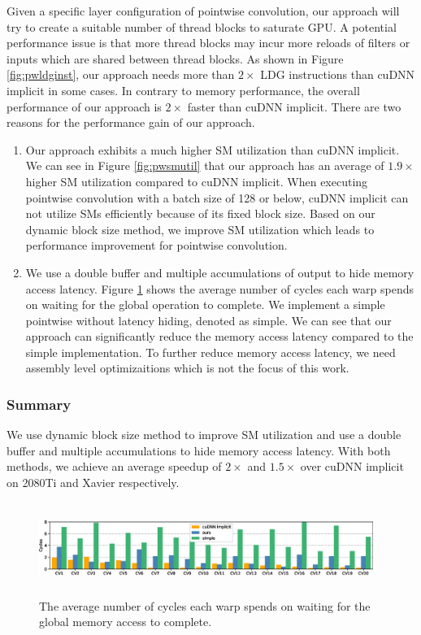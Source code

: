 Given a specific layer configuration of pointwise convolution, our approach will try to create a suitable number of thread blocks to saturate GPU. 
A potential performance issue is that more thread blocks may incur more reloads of filters or inputs which are shared between thread blocks. 
As shown in Figure \ref{fig:pwldginst}, our approach needs more than $2\times$ LDG instructions than cuDNN implicit in some cases.
In contrary to memory performance, the overall performance of our approach is $2\times$ faster than cuDNN implicit.
There are two reasons for the performance gain of our approach. 
\begin{enumerate}
	\item Our approach exhibits a much higher SM utilization than cuDNN implicit.
	We can see in Figure \ref{fig:pwsmutil} that our approach has an average of $1.9\times$ higher SM utilization compared to cuDNN implicit.
	When executing pointwise convolution with a batch size of 128 or below, cuDNN implicit can not utilize SMs efficiently because of its fixed block size. 
	Based on our dynamic block size method, we improve SM utilization which leads to performance improvement for pointwise convolution.
	\item We use a double buffer and multiple accumulations of output to hide memory access latency.
	Figure \ref{fig:stalllongscore} shows the average number of cycles each warp spends on waiting for the global operation to complete. 
	We implement a simple pointwise without latency hiding, denoted as simple. 
	We can see that our approach can significantly reduce the memory access latency compared to the simple implementation.
	To further reduce memory access latency, we need assembly level optimizaitions which is not the focus of this work.
\end{enumerate}

\subsubsection{Summary} We use dynamic block size method to improve SM utilization and use a double buffer and multiple accumulations to hide memory access latency. With both methods, we achieve an average speedup of $2\times$ and $1.5\times$ over cuDNN implicit on 2080Ti and Xavier respectively.


\begin{figure}
    \centering
    \includegraphics[width=0.97\textwidth,height=3cm]{./figure/longscore.eps}
    \caption{The average number of cycles each warp spends on waiting for the global memory access to complete.}
    \label{fig:stalllongscore}
\end{figure}

